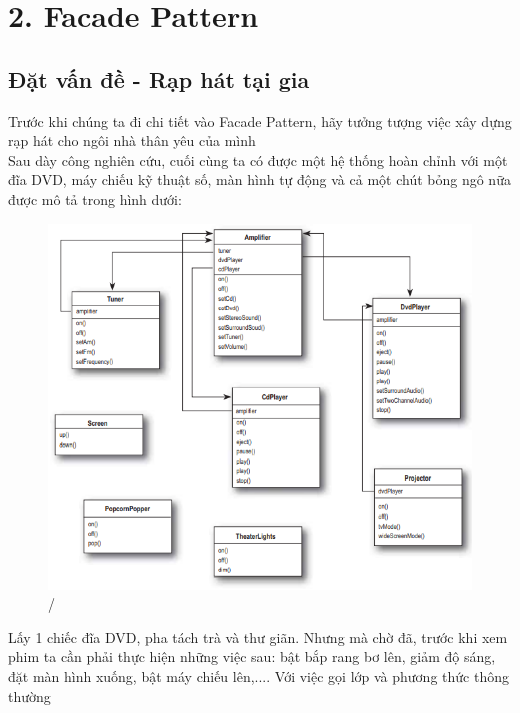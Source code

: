 \chapter{2. Facade Pattern}
\section{Đặt vấn đề - Rạp hát tại gia}
 Trước khi chúng ta đi chi tiết vào Facade Pattern, hãy tưởng tượng việc xây dựng rạp hát cho ngôi nhà thân yêu của mình\\[0.15in]
 Sau dày công nghiên cứu, cuối cùng ta có được một hệ thống hoàn chỉnh với một đĩa DVD, máy chiếu kỹ thuật số, màn hình tự động và cả một chút bỏng ngô nữa được mô tả trong hình dưới:

\begin{figure}[!htb]
    \centering
    \includegraphics[width=\textwidth]{fig/Facade/TheaterSystem.png}/
\end{figure}
\newpage
Lấy 1 chiếc đĩa DVD, pha tách trà và thư giãn. Nhưng mà chờ đã, trước khi xem phim ta cần phải thực hiện những việc sau: bật bắp rang bơ lên, giảm độ sáng, đặt màn hình xuống, bật máy chiếu lên,....  Với việc gọi lớp và phương thức thông thường

